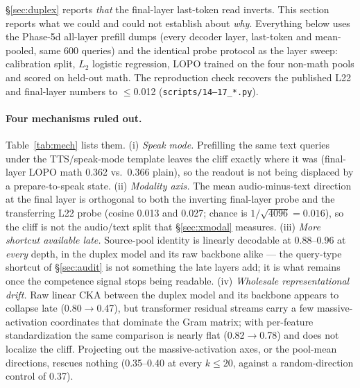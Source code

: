 \S\ref{sec:duplex} reports \emph{that} the final-layer last-token read
inverts. This section reports what we could and could not establish
about \emph{why}. Everything below uses the Phase-5d all-layer prefill
dumps (every decoder layer, last-token and mean-pooled, same 600
queries) and the identical probe protocol as the layer sweep:
calibration split, $L_2$ logistic regression, LOPO trained on the four
non-math pools and scored on held-out math. The reproduction check
recovers the published L22 and final-layer numbers to $\le$0.012
(\texttt{scripts/14--17\_*.py}).

\paragraph{Four mechanisms ruled out.} Table~\ref{tab:mech} lists them.
(i) \emph{Speak mode.} Prefilling the same text queries under the
TTS/speak-mode template leaves the cliff exactly where it was
(final-layer LOPO math 0.362 vs.\ 0.366 plain), so the readout is not
being displaced by a prepare-to-speak state. (ii) \emph{Modality axis.}
The mean audio-minus-text direction at the final layer is orthogonal
to both the inverting final-layer probe and the transferring L22 probe
(cosine 0.013 and 0.027; chance is $1/\sqrt{4096}=0.016$), so the
cliff is not the audio/text split that \S\ref{sec:xmodal} measures.
(iii) \emph{More shortcut available late.} Source-pool identity is
linearly decodable at 0.88--0.96 at \emph{every} depth, in the duplex
model and its raw backbone alike --- the query-type shortcut of
\S\ref{sec:audit} is not something the late layers add; it is
what remains once the competence signal stops being readable.
(iv) \emph{Wholesale representational drift.} Raw linear CKA between
the duplex model and its backbone appears to collapse late
(0.80$\to$0.47), but transformer residual streams carry a few
massive-activation coordinates that dominate the Gram matrix; with
per-feature standardization the same comparison is nearly flat
(0.82$\to$0.78) and does not localize the cliff. Projecting out the
massive-activation axes, or the pool-mean directions, rescues nothing
(0.35--0.40 at every $k\le20$, against a random-direction control of
0.37).

